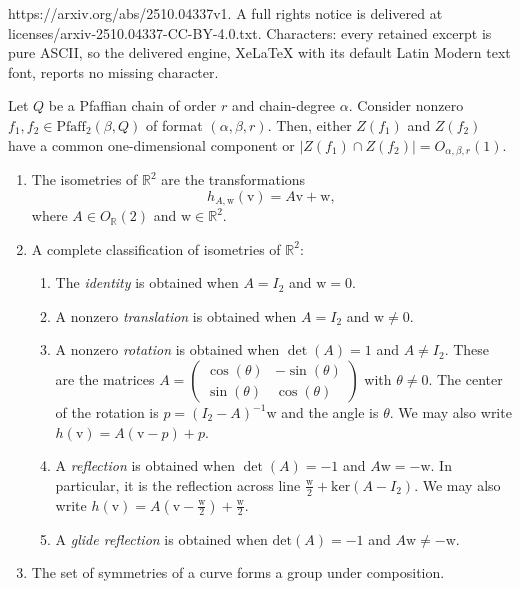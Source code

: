 \documentclass[10pt,a4paper]{amsart}
\newcommand*{\vecv}{\mathrm{v}}
\newcommand*{\vecw}{\mathrm{w}}
\newcommand{\Pf}{\mathrm{Pfaff}}
\newcommand{\RR}{\mathbb R}
\begin{document}
https://arxiv.org/abs/2510.04337v1. A full rights notice is delivered at licenses/arxiv-2510.04337-CC-BY-4.0.txt. Characters: every retained excerpt is pure ASCII, so the delivered engine, XeLaTeX with its default Latin Modern text font, reports no missing character.
\begin{lemma} \label{le:pfBez}
Let $Q$ be a Pfaffian chain of order $r$ and chain-degree $\alpha$. 
Consider nonzero $f_1,f_2 \in \Pf_2(\beta,Q)$ of format $(\alpha,\beta,r)$. 
Then, either $Z(f_1)$ and $Z(f_2)$ have a common one-dimensional component or 
$|Z(f_1)\cap Z(f_2)| = O_{\alpha,\beta,r}(1)$.
\end{lemma}

\begin{enumerate}[label=(\textbf{Iso-\arabic*}),ref=(\textbf{Iso-\arabic*})]
    \item \label{isofact:def} The isometries of $\RR^2$ are the transformations 
    \[ h_{A, \vecw}(\vecv) = A\vecv + \vecw,\]
    where $A \in O_\RR(2)$ and $\vecw \in \RR^2$.
    \item \label{isofact:classification} A complete classification of isometries of $\RR^2$:
    \begin{enumerate}
        \item The \emph{identity} is obtained when $A = I_2$ and $\vecw = 0$. 
        \item A nonzero \emph{translation} is obtained when $A = I_2$ and $\vecw \neq 0$. 
        \item A nonzero \emph{rotation} is obtained when $\det(A)=1$ and $A\neq I_2$. These are the matrices $A = \begin{pmatrix}
            \cos(\theta) & -\sin(\theta) \\ \sin(\theta) & \cos(\theta)
        \end{pmatrix}$ with $\theta \neq 0$. The center of the rotation is $p = (I_2 - A)^{-1}\vecw$ and the angle is $\theta$. We may also write $h(\vecv)=A(\vecv - p) + p$.
        \item A \emph{reflection} is obtained when $\det(A)=-1$ and $A\vecw = -\vecw$. In particular, it is the reflection across line $\frac{\vecw}{2} + \mathrm{ker}(A - I_2)$. We may also write $h(\vecv) = A\left(\vecv - \frac{\vecw}{2}\right) + \frac{\vecw}{2}$.
        \item A \emph{glide reflection} is obtained when $\mathrm{det}(A) = -1$ and $A\vecw \neq -\vecw$. 
    \end{enumerate}
    \item \label{isofact:group} The set of symmetries of a curve forms a group under composition.
\end{enumerate}
\end{document}
